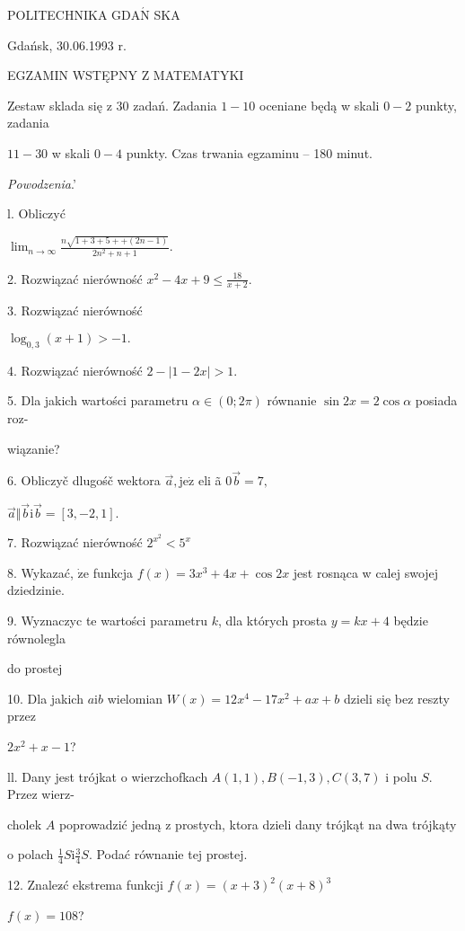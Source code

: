 \documentclass[a4paper,12pt]{article}
\begin{document}
POLITECHNIKA $\mathrm{G}\mathrm{D}\mathrm{A}\acute{\mathrm{N}}$ SKA

Gdańsk, 30.06.1993 r.

EGZAMIN WSTĘPNY Z MATEMATYKI

Zestaw sklada się z 30 zadań. Zadania $1-10$ oceniane będą w skali $0-2$ punkty, zadania

$11-30$ w skali $0-4$ punkty. Czas trwania egzaminu -- 180 minut.

{\it Powodzenia}.'

l. Obliczyć

$\displaystyle \lim_{n\rightarrow\infty}\frac{n\sqrt{1+3+5++(2n-1)}}{2n^{2}+n+1}.$

2. Rozwiązać nierówność $x^{2}-4x+9\displaystyle \leq\frac{18}{x+2}.$

3. Rozwiązać nierówność

$\log_{0,3}(x+1)>-1.$

4. Rozwiązać nierówność $2-|1-2x|>1.$

5. Dla jakich wartości parametru $\alpha \in (0;2\pi)$ równanie $\sin 2x=  2\cos\alpha$ posiada roz-

wiązanie?

6. Obliczyč dlugośč wektora $\vec{a}, \mathrm{j}\mathrm{e}\dot{\mathrm{z}}$ eli ã $0\vec{b}=7,$

$\vec{a}\Vert\vec{b} \mathrm{i} \vec{b}=[3,-2,1].$

7. Rozwiązać nierówność $2^{x^{2}}<5^{x}$

8. Wykazać, $\dot{\mathrm{z}}\mathrm{e}$ funkcja $f(x)=3x^{3}+4x+\cos 2x$ jest rosnąca w calej swojej dziedzinie.

9. Wyznaczyc te wartości parametru $k$, dla których prosta $y=kx+4$ będzie równolegla

do prostej 

10. Dla jakich $a\mathrm{i}b$ wielomian $W(x)=12x^{4}-17x^{2}+ax+b$ dzieli się bez reszty przez

$2x^{2}+x-1$?

ll. Dany jest trójkat o wierzchofkach $A(1,1), B(-1,3), C(3,7)$ i polu $S$. Przez wierz-

cholek $A$ poprowadzić jedną z prostych, ktora dzieli dany trójkąt na dwa trójkąty

o polach $\displaystyle \frac{1}{4}S\mathrm{i}\frac{3}{4}S$. Podać równanie tej prostej.

12. Znalez$\acute{}$ć ekstrema funkcji $f(x) = (x+3)^{2}(x+8)^{3}$

$f(x)=108$?
\end{document}
